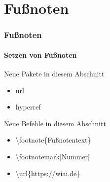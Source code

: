 \section{Fu\ss noten}

\begin{frame}
\frametitle{Fu\ss noten}
\framesubtitle{Setzen von Fu\ss noten}
\begin{exampleblock}{Neue Pakete in diesem Abschnitt}
\begin{itemize}
\item url
\item hyperref
\end{itemize}
\end{exampleblock}
\begin{block}{Neue Befehle in diesem Abschnitt}
\begin{itemize}
\item \color{nounibaredI}\textbackslash footnote\color{black}\{Fu\ss notentext\}
\item \color{nounibaredI}\textbackslash footnotemark\color{nounibagreenI}[Nummer]\color{nounibaredI}
\item \textbackslash url\color{black}\{https://wiai.de\}
\end{itemize}
\end{block}
\end{frame}


